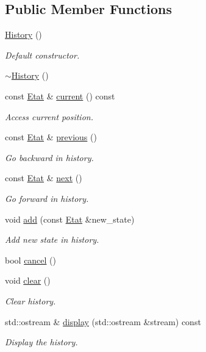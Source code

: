 \subsection*{Public Member Functions}
\begin{DoxyCompactItemize}
\item 
\hyperlink{class_history_afba1384643f419d079e78adb1497f741}{History} ()
\begin{DoxyCompactList}\small\item\em Default constructor. \end{DoxyCompactList}\item 
\hyperlink{class_history_a5b00b64a1ddee04e60d5a3b517fd6d4c}{$\sim$\+History} ()
\item 
const \hyperlink{class_etat}{Etat} \& \hyperlink{class_history_a0ca66ba5a026689877e027754fc5bd52}{current} () const
\begin{DoxyCompactList}\small\item\em Access current position. \end{DoxyCompactList}\item 
const \hyperlink{class_etat}{Etat} \& \hyperlink{class_history_a8a0bb0748169bc93404987108a14f4bc}{previous} ()
\begin{DoxyCompactList}\small\item\em Go backward in history. \end{DoxyCompactList}\item 
const \hyperlink{class_etat}{Etat} \& \hyperlink{class_history_ab0535cf179200bf8a79a854aac783aa1}{next} ()
\begin{DoxyCompactList}\small\item\em Go forward in history. \end{DoxyCompactList}\item 
void \hyperlink{class_history_a90222df7f73ae9cfda56bdb66cb1985e}{add} (const \hyperlink{class_etat}{Etat} \&new\+\_\+state)
\begin{DoxyCompactList}\small\item\em Add new state in history. \end{DoxyCompactList}\item 
bool \hyperlink{class_history_a6e1bcaa1d3ecc646131e6f73a2544f35}{cancel} ()
\item 
void \hyperlink{class_history_a8ef13fdf00ec0786268fd6bd211bf38f}{clear} ()
\begin{DoxyCompactList}\small\item\em Clear history. \end{DoxyCompactList}\item 
std\+::ostream \& \hyperlink{class_history_a5c1724d84912d1571d2475b2fb703081}{display} (std\+::ostream \&stream) const
\begin{DoxyCompactList}\small\item\em Display the history. \end{DoxyCompactList}\end{DoxyCompactItemize}


